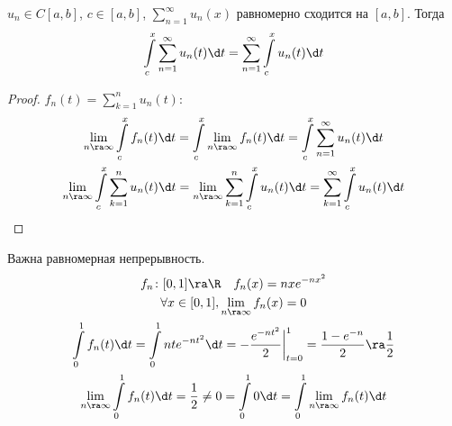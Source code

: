 \begin{conseq}
	$u_n \in C[a,b]$, $c \in [a, b]$, $\sum_{n=1}^\infty u_n(x)$ равномерно сходится на $[a,b]$.
	Тогда
	\[ \int\limits_c^x \sum_{n=1}^\infty u_n(t) \d t = \sum_{n=1}^\infty \int\limits_c^x u_n(t) \d t \]
\end{conseq}
\begin{proof}
	$f_n(t) = \sum_{k=1}^n u_n(t)$:
	\begin{gather*}
		\lim_{n \ra \infty} \int\limits_c^x f_n(t) \d t
		= \int\limits_c^x \lim_{n \ra \infty} f_n(t) \d t
		= \int\limits_c^x \sum_{n=1}^\infty u_n(t) \d t \\
		\lim_{n \ra \infty} \int\limits_c^x \sum_{k=1}^n u_n(t) \d t
		= \lim_{n \ra \infty} \sum_{k=1}^n \int\limits_c^x u_n(t) \d t
		= \sum_{k=1}^\infty \int\limits_c^x u_n(t) \d t
	\end{gather*}
\end{proof}

\begin{exmp}
	Важна равномерная непрерывность.
	\begin{gather*}
		f_n\colon [0,1] \ra \R \quad f_n(x) = nxe^{-nx^2} \\
		\forall x \in [0, 1], \lim_{n \ra \infty} f_n(x) = 0 \\
		\int\limits_0^1 f_n(t) \d t = \int\limits_0^1 nte^{-nt^2} \d t = -\frac{e^{-nt^2}}2\biggr|_{t=0}^1 = \frac{1-e^{-n}}2 \ra \frac12 \\
		\lim_{n \ra \infty} \int\limits_0^1 f_n(t) \d t
		= \frac12
		\ne 0
		= \int\limits_0^1 0 \d t
		= \int\limits_0^1 \lim_{n \ra \infty} f_n(t) \d t
	\end{gather*}
\end{exmp}